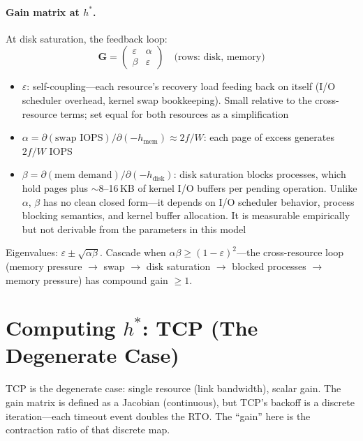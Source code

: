 \documentclass[11pt]{article}
\begin{document}
\paragraph{Gain matrix at $h^*$.} At disk saturation, the feedback loop:
\begin{equation}
  \mathbf{G} = \begin{pmatrix} \varepsilon & \alpha \\ \beta & \varepsilon
  \end{pmatrix}
  \quad\text{(rows: disk, memory)}
\end{equation}

\begin{itemize}[nosep]
  \item $\varepsilon$: self-coupling---each resource's recovery load feeding back
    on itself (I/O scheduler overhead, kernel swap bookkeeping). Small relative
    to the cross-resource terms; set equal for both resources as a simplification
  \item $\alpha = \partial(\text{swap IOPS}) / \partial(-h_{\mathrm{mem}})
    \approx 2f/W$: each page of excess generates $2f/W$ IOPS
  \item $\beta = \partial(\text{mem demand}) / \partial(-h_{\mathrm{disk}})$:
    disk saturation blocks processes, which hold pages plus ${\sim}8$--16\,KB of
    kernel I/O buffers per pending operation. Unlike $\alpha$, $\beta$ has no
    clean closed form---it depends on I/O scheduler behavior, process blocking
    semantics, and kernel buffer allocation. It is measurable empirically but
    not derivable from the parameters in this model
\end{itemize}

Eigenvalues: $\varepsilon \pm \sqrt{\alpha\beta}$. Cascade when
$\alpha\beta \geq (1 - \varepsilon)^2$---the cross-resource loop (memory pressure
$\to$ swap $\to$ disk saturation $\to$ blocked processes $\to$ memory pressure)
has compound gain $\geq 1$.

\section{Computing $h^*$: TCP (The Degenerate Case)}
\label{sec:tcp-hstar}

TCP is the degenerate case: single resource (link bandwidth), scalar gain.
The gain matrix is defined as a Jacobian (continuous), but TCP's backoff is a
discrete iteration---each timeout event doubles the RTO. The ``gain'' here is
the contraction ratio of that discrete map.
\end{document}
